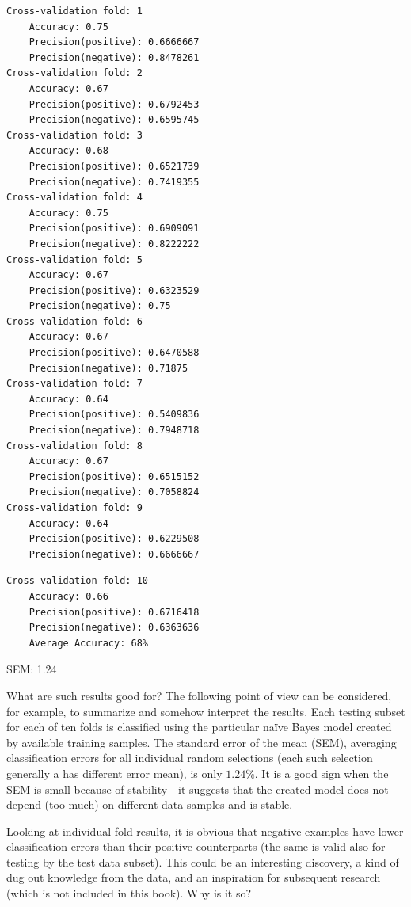 \documentclass[10pt]{book}
\begin{document}
\begin{verbatim}
Cross-validation fold: 1
    Accuracy: 0.75
    Precision(positive): 0.6666667
    Precision(negative): 0.8478261
Cross-validation fold: 2
    Accuracy: 0.67
    Precision(positive): 0.6792453
    Precision(negative): 0.6595745
Cross-validation fold: 3
    Accuracy: 0.68
    Precision(positive): 0.6521739
    Precision(negative): 0.7419355
Cross-validation fold: 4
    Accuracy: 0.75
    Precision(positive): 0.6909091
    Precision(negative): 0.8222222
Cross-validation fold: 5
    Accuracy: 0.67
    Precision(positive): 0.6323529
    Precision(negative): 0.75
Cross-validation fold: 6
    Accuracy: 0.67
    Precision(positive): 0.6470588
    Precision(negative): 0.71875
Cross-validation fold: 7
    Accuracy: 0.64
    Precision(positive): 0.5409836
    Precision(negative): 0.7948718
Cross-validation fold: 8
    Accuracy: 0.67
    Precision(positive): 0.6515152
    Precision(negative): 0.7058824
Cross-validation fold: 9
    Accuracy: 0.64
    Precision(positive): 0.6229508
    Precision(negative): 0.6666667
\end{verbatim}

\begin{verbatim}
Cross-validation fold: 10
    Accuracy: 0.66
    Precision(positive): 0.6716418
    Precision(negative): 0.6363636
    Average Accuracy: 68%
\end{verbatim}

SEM: 1.24

What are such results good for? The following point of view can be considered, for example, to summarize and somehow interpret the results. Each testing subset for each of ten folds is classified using the particular naïve Bayes model created by available training samples. The standard error of the mean (SEM), averaging classification errors for all individual random selections (each such selection generally a has different error mean), is only $1.24 \%$. It is a good sign when the SEM is small because of stability - it suggests that the created model does not depend (too much) on different data samples and is stable.

Looking at individual fold results, it is obvious that negative examples have lower classification errors than their positive counterparts (the same is valid also for testing by the test data subset). This could be an interesting discovery, a kind of dug out knowledge from the data, and an inspiration for subsequent research (which is not included in this book). Why is it so?
\end{document}
